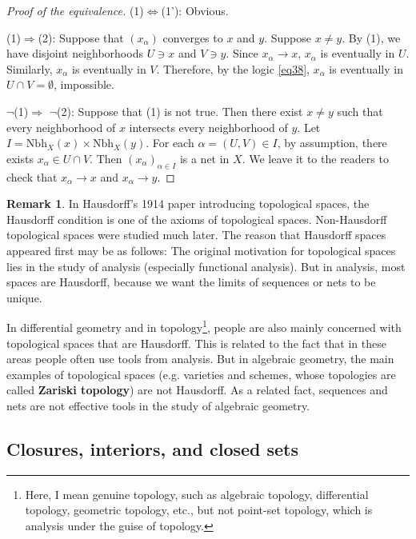 \documentclass[12pt,b5paper,notitlepage]{article}
\theoremstyle{definition}
\newtheorem{rem}[df]{Remark}
\theoremstyle{plain}
\newcommand{\Nbh}{\mathrm{Nbh}}
\numberwithin{equation}{section}
\begin{document}
\begin{proof}[Proof of the equivalence]
(1)$\Leftrightarrow$(1'): Obvious.

(1)$\Rightarrow$(2): Suppose that $(x_\alpha)$ converges to $x$ and $y$. Suppose $x\neq y$. By (1),  we have disjoint neighborhoods $U\ni x$ and $V\ni y$. Since $x_\alpha\rightarrow x$, $x_\alpha$ is eventually in $U$. Similarly, $x_\alpha$ is eventually in $V$. Therefore, by the logic \eqref{eq38}, $x_\alpha$ is eventually in $U\cap V=\emptyset$, impossible.

$\neg$(1)$\Rightarrow$ $\neg$(2): Suppose that (1) is not true. Then there exist $x\neq y$ such that every neighborhood of $x$ intersects every neighborhood of $y$. Let $I=\Nbh_X(x)\times\Nbh_X(y)$. For each $\alpha=(U,V)\in I$, by assumption, there exists $x_\alpha\in U\cap V$. Then $(x_\alpha)_{\alpha\in I}$ is a net in $X$. We leave it to the readers to check that $x_\alpha\rightarrow x$ and $x_\alpha\rightarrow y$.
\end{proof}


\begin{rem}
In Hausdorff's 1914 paper introducing topological spaces, the Hausdorff condition is one of the axioms of topological spaces. Non-Hausdorff topological spaces were studied much later. The reason that Hausdorff spaces appeared first may be as follows: The original motivation for topological spaces lies in the study of analysis (especially functional analysis). But in analysis, most spaces are Hausdorff, because we want the limits of sequences or nets to be unique. 

In differential geometry and in topology\footnote{Here, I mean genuine topology, such as algebraic topology, differential topology, geometric topology, etc., but not point-set topology, which is analysis under the guise of topology.}, people are also mainly concerned with topological spaces that are Hausdorff. This is related to the fact that in these areas people often use tools from analysis. But in algebraic geometry, the main examples of topological spaces (e.g. varieties and schemes, whose topologies are called \textbf{Zariski topology}) are not Hausdorff.  As a related fact, sequences and nets are not effective tools in the study of algebraic geometry.  \hfill\qedsymbol
\end{rem}

\subsection{Closures, interiors, and closed sets}
\end{document}
